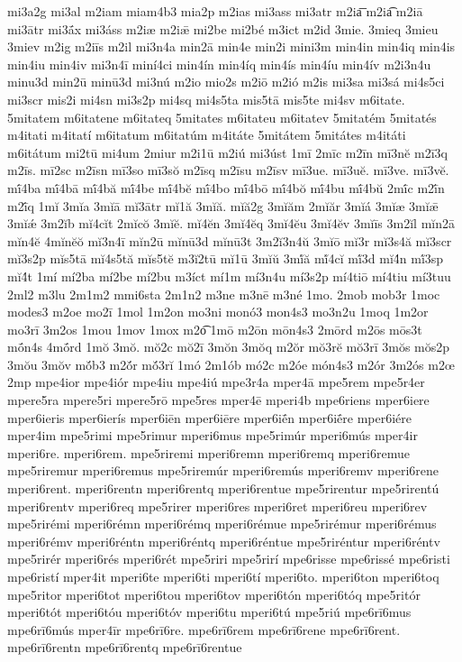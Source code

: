 {mi3a2g
mi3al
m2iam
miam4b3
mia2p
m2ias
mi3ass
mi3atr
m2ia͞
m2ia͡
m2iā
mi3ātr
mi3ā́x
mi3áss
m2iæ
m2iǣ
mi2be
mi2bé
m3ict
m2id
3mie.
3mieq
3mieu
3miev
m2ig
m2iīs
m2il
mi3n4a
min2ā
min4e
min2i
mini3m
min4in
min4iq
min4is
min4iu
min4iv
mi3n4ī
miní4ci
min4ín
min4íq
min4ís
min4íu
min4ív
m2i3n4u
minu3d
min2ū
minū3d
mi3nú
m2io
mio2s
m2iō
m2ió
m2is
mi3sa
mi3sá
mi4s5ci
mi3scr
mis2i
mi4sn
mi3s2p
mi4sq
mi4s5ta
mis5tā
mis5te
mi4sv
m6itate.
5mitatem
m6itatene
m6itateq
5mitates
m6itateu
m6itatev
5mitatém
5mitatés
m4itati
m4itatí
m6itatum
m6itatúm
m4itáte
5mitátem
5mitátes
m4itáti
m6itátum
mi2tū
mi4um
2miur
m2i1ū
m2iú
mi3úst
1mī
2mīc
m2īn
mī3nĕ
m2ī3q
m2īs.
mī2sc
m2īsn
mī3so
mī3sŏ
m2īsq
m2īsu
m2īsv
mī3ue.
mī3uĕ.
mī3ve.
mī3vĕ.
mī́4ba
mī́4bā
mī́4bă
mī́4be
mī́4bĕ
mī́4bo
mī́4bō
mī́4bŏ
mī́4bu
mī́4bŭ
2mī́c
m2ī́n
m2ī́q
1mĭ
3mĭa
3mĭā
mĭ3ātr
mĭ1ă
3mĭă.
mĭă2g
3mĭăm
2mĭăr
3mĭá
3mĭæ
3mĭǣ
3mĭǽ
3m2ĭb
mĭ4cĭt
2mĭcŏ
3mĭĕ.
mĭ4ĕn
3mĭ4ĕq
3mĭ4ĕu
3mĭ4ĕv
3mĭīs
3m2ĭl
mĭn2ā
mĭn4ĕ
4mĭnĕŏ
mĭ3n4ī
mĭn2ū
mĭnū3d
mĭnū3t
3m2ĭ3n4ŭ
3mĭō
mĭ3r
mĭ3s4ă
mĭ3scr
mĭ3s2p
mĭs5tā
mĭ4s5tă
mĭs5tĕ
m3ĭ2tū
mĭ1ū
3mĭŭ
3mĭ́ă
mĭ́4cĭ
mĭ́3d
mĭ4́n
mĭ́3sp
mĭ4́t
1mí
mí2ba
mí2be
mí2bu
m3íct
mí1m
mí3n4u
mí3s2p
mí4tiō
mí4tiu
mí3tuu
2ml2
m3lu
2m1m2
mmi6sta
2m1n2
m3ne
m3nē
m3né
1mo.
2mob
mob3r
1moc
modes3
m2oe
mo2ī
1mol
1m2on
mo3ni
monó3
mon4s3
mo3n2u
1moq
1m2or
mo3rī
3m2os
1mou
1mov
1mox
m2o͡
1mō
m2ōn
mōn4s3
2mōrd
m2ōs
mōs3t
mṓn4s
4mṓrd
1mŏ
3mŏ.
mŏ2c
mŏ2ī
3mŏn
3mŏq
m2ŏr
mŏ3rĕ
mŏ3rī
3mŏs
mŏs2p
3mŏu
3mŏv
mŏ́b3
m2ŏ́r
mŏ́3rĭ
1mó
2m1ób
mó2c
m2óe
món4s3
m2ór
3m2ós
m2œ
2mp
mpe4ior
mpe4iór
mpe4iu
mpe4iú
mpe3r4a
mper4ā
mpe5rem
mpe5r4er
mpere5ra
mpere5ri
mpere5rō
mpe5res
mper4ē
mperi4b
mpe6riens
mper6iere
mper6ieris
mper6ierís
mper6iēn
mper6iēre
mper6iḗn
mper6iḗre
mper6iére
mper4im
mpe5rimi
mpe5rimur
mperi6mus
mpe5rimúr
mperi6mús
mper4ir
mperi6re.
mperi6rem.
mpe5riremi
mperi6remn
mperi6remq
mperi6remue
mpe5riremur
mperi6remus
mpe5riremúr
mperi6remús
mperi6remv
mperi6rene
mperi6rent.
mperi6rentn
mperi6rentq
mperi6rentue
mpe5rirentur
mpe5rirentú
mperi6rentv
mperi6req
mpe5rirer
mperi6res
mperi6ret
mperi6reu
mperi6rev
mpe5rirémi
mperi6rémn
mperi6rémq
mperi6rémue
mpe5rirémur
mperi6rémus
mperi6rémv
mperi6réntn
mperi6réntq
mperi6réntue
mpe5riréntur
mperi6réntv
mpe5rirér
mperi6rés
mperi6rét
mpe5riri
mpe5rirí
mpe6risse
mpe6rissé
mpe6risti
mpe6ristí
mper4it
mperi6te
mperi6ti
mperi6tí
mperi6to.
mperi6ton
mperi6toq
mpe5ritor
mperi6tot
mperi6tou
mperi6tov
mperi6tón
mperi6tóq
mpe5ritór
mperi6tót
mperi6tóu
mperi6tóv
mperi6tu
mperi6tú
mpe5riú
mpe6rī6mus
mpe6rī6mús
mper4īr
mpe6rī6re.
mpe6rī6rem
mpe6rī6rene
mpe6rī6rent.
mpe6rī6rentn
mpe6rī6rentq
mpe6rī6rentue
}
